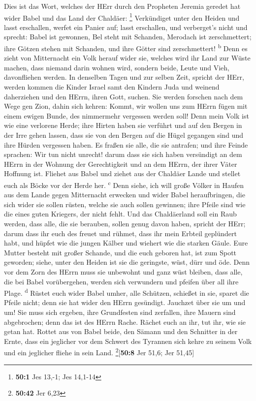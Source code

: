  Dies ist das Wort, welches der HErr durch den Propheten
Jeremia geredet hat wider Babel und das Land der Chaldäer: \footnote{\textbf{50:1}
  Jes 13,-1; Jes 14,1-14}  Verkündiget unter den Heiden
und lasst erschallen, werfet ein Panier auf; lasst erschallen, und
verberget's nicht und sprecht: Babel ist gewonnen, Bel steht mit
Schanden, Merodach ist zerschmettert; ihre Götzen stehen mit Schanden,
und ihre Götter sind zerschmettert! \textsuperscript{b} 
Denn es zieht von Mitternacht ein Volk herauf wider sie, welches wird
ihr Land zur Wüste machen, dass niemand darin wohnen wird, sondern
beide, Leute und Vieh, davonfliehen werden.  In denselben
Tagen und zur selben Zeit, spricht der HErr, werden kommen die Kinder
Israel samt den Kindern Juda und weinend daherziehen und den HErrn,
ihren Gott, suchen.  Sie werden forschen nach dem Wege gen
Zion, dahin sich kehren: Kommt, wir wollen uns zum HErrn fügen mit einem
ewigen Bunde, des nimmermehr vergessen werden soll!  Denn
mein Volk ist wie eine verlorene Herde; ihre Hirten haben sie verführt
und auf den Bergen in der Irre gehen lassen, dass sie von den Bergen auf
die Hügel gegangen sind und ihre Hürden vergessen haben. 
Es fraßen sie alle, die sie antrafen; und ihre Feinde sprachen: Wir tun
nicht unrecht! darum dass sie sich haben versündigt an dem HErrn in der
Wohnung der Gerechtigkeit und an dem HErrn, der ihrer Väter Hoffnung
ist.  Fliehet aus Babel und ziehet aus der Chaldäer Lande
und stellet euch als Böcke vor der Herde her. \textsuperscript{c}
 Denn siehe, ich will große Völker in Haufen aus dem Lande
gegen Mitternacht erwecken und wider Babel heraufbringen, die sich wider
sie sollen rüsten, welche sie auch sollen gewinnen; ihre Pfeile sind wie
die eines guten Kriegers, der nicht fehlt.  Und das
Chaldäerland soll ein Raub werden, dass alle, die sie berauben, sollen
genug davon haben, spricht der HErr;  darum dass ihr euch
des freuet und rühmet, dass ihr mein Erbteil geplündert habt, und hüpfet
wie die jungen Kälber und wiehert wie die starken Gäule. 
Eure Mutter besteht mit großer Schande, und die euch geboren hat, ist
zum Spott geworden; siehe, unter den Heiden ist sie die geringste, wüst,
dürr und öde.  Denn vor dem Zorn des HErrn muss sie
unbewohnt und ganz wüst bleiben, dass alle, die bei Babel vorübergehen,
werden sich verwundern und pfeifen über all ihre Plage.
\textsuperscript{d}  Rüstet euch wider Babel umher, alle
Schützen, schießet in sie, sparet die Pfeile nicht; denn sie hat wider
den HErrn gesündigt.  Jauchzet über sie um und um! Sie
muss sich ergeben, ihre Grundfesten sind zerfallen, ihre Mauern sind
abgebrochen; denn das ist des HErrn Rache. Rächet euch an ihr, tut ihr,
wie sie getan hat.  Rottet aus von Babel beide, den
Sämann und den Schnitter in der Ernte, dass ein jeglicher vor dem
Schwert des Tyrannen sich kehre zu seinem Volk und ein jeglicher fliehe
in sein Land. \footnote{\textbf{50:42} Jer 6,23}{[}\textbf{50:8} Jer
51,6; Jer 51,45{]}

